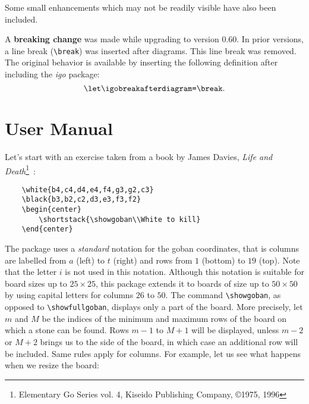 \documentclass[fleqn]{article}
\begin{document}
Some small enhancements which may not be readily visible have also been included.

A \textbf{breaking change}\marginpar{\framebox{\Large{!\ }}} was made while upgrading to version 0.60. In prior versions, a line break (\verb|\break|) was inserted after diagrams. This line break was removed. The original behavior is available by inserting the following definition after including the \textit{igo} package: \[\verb|\let\igobreakafterdiagram=\break|.\]
		
\section{User Manual}

Let's start with an exercise taken from a book by James Davies, \textit{Life and Death}\footnote{Elementary Go Series vol. 4, Kiseido Publishing Company, \copyright 1975, 1996}~:

\medskip
\begin{minipage}[c][1.0\height][c]{0.65\textwidth}
\begin{verbatim}
	\white{b4,c4,d4,e4,f4,g3,g2,c3}
	\black{b3,b2,c2,d3,e3,f3,f2}
	\begin{center}
		\shortstack{\showgoban\\White to kill}
	\end{center}
\end{verbatim}
\end{minipage}
%
\begin{minipage}[c][1.0\height][r]{0.25\textwidth}
\begin{center}
\end{center}
\end{minipage}
\medskip

The package uses a \textit{standard} notation for the goban coordinates, that is columns are labelled from $a$ (left) to $t$ (right) and rows from $1$ (bottom) to $19$ (top). Note that the letter $i$ is not used in this notation. Although this notation is suitable for board sizes up to $25 \times 25$, this package extends it to boards of size up to $50 \times 50$ by using capital letters for columns $26$ to $50$. The command \verb|\showgoban|, as opposed to \verb|\showfullgoban|, displays only a part of the board. More precisely, let $m$ and $M$ be the indices of the minimum and maximum rows of the board on which a stone can be found. Rows $m-1$ to $M+1$ will be displayed, unless $m-2$ or $M+2$ brings us to the side of the board, in which case an additional row will be included. Same rules apply for columns. For example, let us see what happens when we resize the board:
\end{document}

